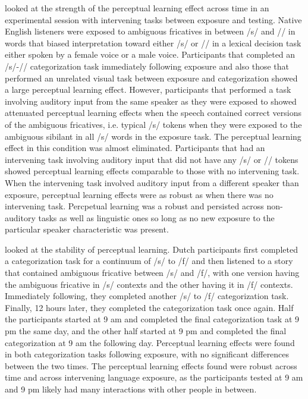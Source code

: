 \citet{Kraljic2005} looked at the strength of the perceptual learning effect across time in an experimental session with intervening tasks between exposure and testing. 
Native English listeners were exposed to ambiguous fricatives in between /s/ and /\textesh/ in words that biased interpretation toward either /s/ or /\textesh/ in a lexical decision task either spoken by a female voice or a male voice.
Participants that completed an /s/-/\textesh/ categorization task immediately following exposure and also those that performed an unrelated visual task between exposure and categorization showed a large perceptual learning effect.  
However, participants that performed a task involving auditory input from the same speaker as they were exposed to showed attenuated perceptual learning effects when the speech contained correct versions of the ambiguous fricatives, i.e. typical /s/ tokens when they were exposed to the ambiguous sibilant in all /s/ words in the exposure task.  
The perceptual learning effect in this condition was almost eliminated. 
Participants that had an intervening task involving auditory input that did not have any /s/ or /\textesh/ tokens showed perceptual learning effects comparable to those with no intervening task.  
When the intervening task involved auditory input from a different speaker than exposure, perceptual learning effects were as robust as when there was no intervening task.
Percpetual learning was a robust and persisted across non-auditory tasks as well as linguistic ones so long as no new exposure to the particular speaker characteristic was present.

\citet{Eisner2006} looked at the stability of perceptual learning. 
Dutch participants first completed a categorization task for a continuum of /s/ to /f/ and then listened to a story that contained ambiguous fricative between /s/ and /f/, with one version having the ambiguous fricative in /s/ contexts and the other having it in /f/ contexts.
Immediately following, they completed another /s/ to /f/ categorization task.  
Finally, 12 hours later, they completed the categorization task once again.
Half the participants started at 9 am and completed the final categorization task at 9 pm the same day, and the other half started at 9 pm and completed the final categorization at 9 am the following day.
Perceptual learning effects were found in both categorization tasks following exposure, with no significant differences between the two times. 
 The perceptual learning effects found were robust across time and across intervening language exposure, as the participants tested at 9 am and 9 pm likely had many interactions with other people in between.

